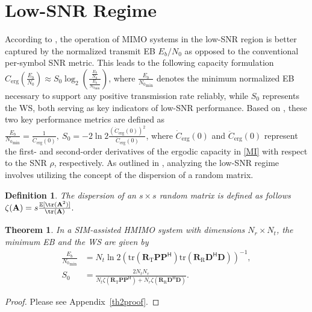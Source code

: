 \documentclass[twocolumn,10pt]{IEEEtran}
\renewcommand{\H}{{\scriptscriptstyle\mathsf{H}}}
\def\bA{{\mathbf{A}}}
\def\bD{{\mathbf{D}}}
\def\bP{{\mathbf{P}}}
\def\bR{{\mathbf{R}}}
\newcommand{\EE}{\mathbb{E}}
\newtheorem{definition}{Definition}%
\newtheorem{theorem}{Theorem}%
\begin{document}
	\section{Low-SNR Regime}
	According to \cite{Lozano2003}, the operation of MIMO systems in the low-SNR region is better captured by the normalized transmit EB $E_{b}/N_{0}$ as opposed to the conventional per-symbol SNR metric. This leads to the following capacity formulation $	C_{\mathrm{erg}}\left(\frac{E_{b}}{N_{0}}\right)\approx S_{0} \log_{2}\left(\frac{\frac{E_{b}}{N_{0}}}{\frac{E_{b}}{{N_{0}}_{\min}}}\right)$, 
	where $\frac{E_{b}}{{N_{0}}_{\min}}$ denotes the minimum normalized EB necessary to support any positive transmission rate reliably, while $S_{0}$ represents the WS, both serving as key indicators of low-SNR performance. Based on \cite{Verdu2002}, these two key performance metrics are defined as $\frac{E_{b}}{{N_{0}}_{\min}}=\frac{1}{\dot	C_{\mathrm{erg}}(0)}, ~S_{0}=-2\ln2\frac{\left(\dot C_{\mathrm{erg}}(0)\right)^{2}}{\ddot C_{\mathrm{erg}}(0)}$,  
	where $\dot{C}_{\mathrm{erg}}(0)$ and $\ddot{C}_{\mathrm{erg}}(0)$ represent the first- and second-order derivatives of the ergodic capacity in \eqref{MI} with respect to the SNR $\rho$, respectively. As outlined in \cite{Lozano2003}, analyzing the low-SNR regime involves utilizing the concept of the dispersion of a random matrix.
	\begin{definition}
		The dispersion of an $s \times s$ random matrix is defined as follows $		\zeta(\bA)=s\frac{\EE[\tr(\bA^{2})]}{\tr(\bA)}.$
	\end{definition}
	
	\begin{theorem}\label{th2}
		In a SIM-assisted HMIMO system with dimensions $N_{r} \times N_{t}$, the minimum EB and the WS are given by
		\begin{align}
			\frac{E_{b}}{{N_{0}}_{\min}}&=N_{t}\ln 2(\mathrm{tr}\left(\bR_{\mathrm{T}}\bP\bP^{\H}\right)\mathrm{tr}\left(\bR_{\mathrm{R}}\bD^{\H}\bD\right))^{-1},\label{minEnergy}\\
			S_{0}&=\frac{2 N_{t}N_{r}}{N_{t}\zeta(\bR_{\mathrm{T}}\bP\bP^{\H})+N_{r}\zeta(\bR_{\mathrm{R}}\bD^{\H}\bD)}.\label{slope}
		\end{align}
	\end{theorem}
	\begin{proof}
		Please see Appendix~\ref{th2proof}.	
	\end{proof}
	
\end{document}
